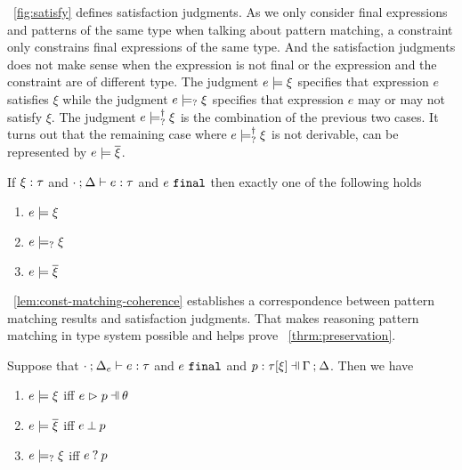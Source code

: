 \documentclass[runningheads,envcountsame,a4paper]{llncs}
\begin{document}


\figurename~\ref{fig:satisfy} defines satisfaction judgments. As we only
consider final expressions and patterns of the same type when talking about
pattern matching, a constraint only constrains final expressions of the same
type. And the satisfaction judgments does not make sense when the expression is
not final or the expression and the constraint are of different type. The
judgment $e \models \xi$ specifies that expression $e$ satisfies $\xi$ while
the judgment $e \models_{?} \xi$ specifies that expression $e$ may or may not
satisfy $\xi$. The judgment $e \models_{?}^{\dag} \xi$ is the combination of the
previous two cases. It turns out that the remaining case where
$e \models_{?}^{\dag} \xi$ is not derivable, can be represented by
$e \models \overline{\xi}$.

\begin{theorem}
  \label{thrm:exclusive-constraint-satisfaction}
  If $\xi : \tau$ and $\cdot \mathbin{;} \Delta \vdash e : \tau$ and $e ~\mathtt{final}$ then exactly one of the following holds
  \begin{enumerate}
  \item $e \models \xi$
  \item $e \models_{?} \xi$
  \item $e \models \overline{\xi}$
  \end{enumerate}
\end{theorem}

\lemmaname~\ref{lem:const-matching-coherence} establishes a correspondence
between pattern matching results and satisfaction judgments. That makes
reasoning pattern matching in type system possible and helps prove
\theoremname~\ref{thrm:preservation}.

\begin{lemma}
  \label{lem:const-matching-coherence}
  Suppose that $\cdot \mathbin{;} \Delta_e \vdash e : \tau$ and $e ~\mathtt{final}$ and $\chpattyp{p}{\tau}{\xi}{\Gamma}{\Delta}$. Then we have
  \begin{enumerate}
  \item $e \models \xi$ iff $\hpatmatch{e}{p}{\theta}$
  \item $e \models \overline{\xi}$ iff $e \mathbin{\bot} p$
  \item $e \models_{?} \xi$ iff $e \mathbin{?} p$
  \end{enumerate}
\end{lemma}
\end{document}
